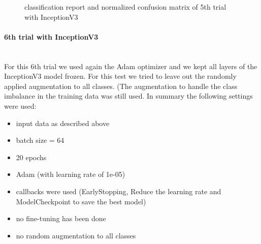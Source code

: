 \documentclass{article}
\begin{document}
\begin{figure}%
  \centering
  \qquad
  \caption{classification report and normalized confusion matrix of 5th trial with InceptionV3}
  \label{fig:inceptionv3_08_results}
\end{figure}

\paragraph{6th trial with InceptionV3}\mbox{}\\

For this 6th trial we used again the Adam optimizer and we kept all layers of the InceptionV3 model frozen.  For this test we tried to leave out the randomly applied augmentation to all classes. (The augmentation to handle the class imbalance in the training data was still used. In summary the following settings were used: 
\begin{itemize}
\item input data as described above
\item batch size = 64
\item 20 epochs 
\item Adam (with learning rate of 1e-05)
\item callbacks were used (EarlyStopping, Reduce the learning rate and ModelCheckpoint to save the best model)
\item no fine-tuning has been done
\item no random augmentation to all classes 
\end{itemize}
\end{document}
